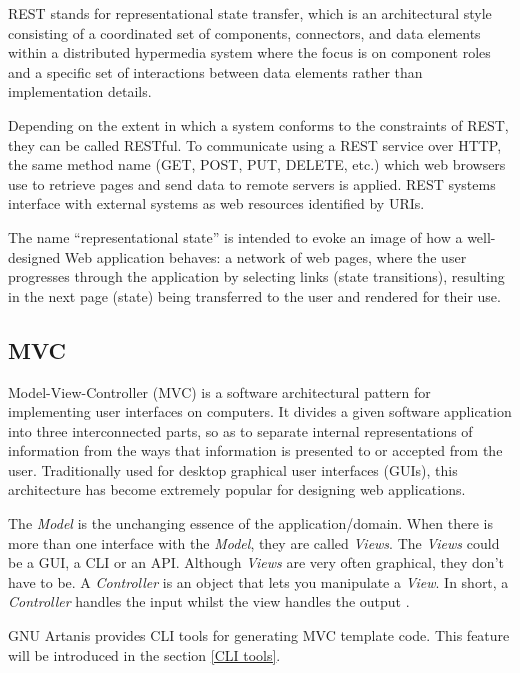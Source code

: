 \documentclass[numbers,numberedpars]{sigplanconf}
\begin{document}
REST stands for representational state transfer, which is an architectural style consisting of a coordinated set of components, connectors, and data elements within a distributed hypermedia system where the focus is on component roles and a specific set 
of interactions between data elements rather than implementation details.

Depending on the extent in which a system conforms to the constraints of REST, they can be called RESTful. To communicate using a REST service over HTTP, the same method
name (GET, POST, PUT, DELETE, etc.) which web browsers use to retrieve pages and send data to remote servers is applied. REST systems interface with external systems as web resources identified by URIs.

The name ``representational state'' is intended to evoke an image of how a well-designed Web application behaves: a network of web pages, where the user progresses through the application by selecting links (state transitions), resulting in the next page (state) being transferred to the user and rendered for their use.



\subsection{MVC}

Model-View-Controller (MVC) is a software architectural pattern for implementing user interfaces on computers. It divides a given software application into three interconnected parts, so as to separate internal representations of information from the ways that information is presented to or accepted from the user. Traditionally used for desktop graphical user interfaces (GUIs), this architecture has become extremely
popular for designing web applications.

The {\it Model} is the unchanging essence of the application/domain. When there is more than one interface with the {\it Model}, they are called {\it Views}. The {\it Views} could be a GUI, a CLI or an API. Although {\it Views} are very often graphical, they don’t have to be. A {\it Controller} is an object that lets you manipulate a {\it View}. In short, a {\it Controller} handles the input whilst the view handles the output \citep{deacon2009model}.

GNU Artanis provides CLI tools for generating MVC template code. This feature will be introduced in the section \ref{CLI tools}.
\end{document}
